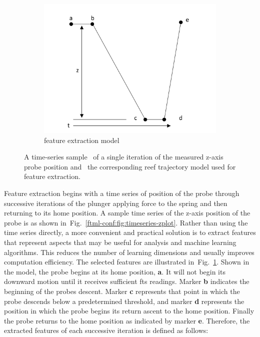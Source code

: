 \begin{figure}[!ht]
	\begin{subfigure}{.95\textwidth}
		\centering
		\includegraphics[]{./chapter-ftml/diagrams/timeseries.png}  
		\caption{feature extraction model}
		\label{ftml-conf:fig:timeseriesfeatures}
	\end{subfigure}
	
	\caption{A time-series sample~\protect{} of a single iteration of the measured z-axis probe position and~\protect{} the corresponding \gls{reef} trajectory model used for feature extraction.}
	\label{ftml-conf:fig:timeseries-and-model}
	
\end{figure}

Feature extraction begins with a time series of position of the probe through successive iterations of the plunger applying force to the spring and then returning to its home position.  A sample time series of the z-axis position of the probe is as shown in~Fig.~\ref{ftml-conf:fig:timeseries-zplot}.  Rather than using the time series directly, a more convenient and practical solution is to extract features that represent aspects that may be useful for analysis and machine learning algorithms.  This reduces the number of learning dimensions and usually improves computation efficiency.  The selected features are illustrated in~Fig.~\ref{ftml-conf:fig:timeseriesfeatures}.   Shown in the model, the probe begins at its home position, \textbf{a}.  It will not begin its downward motion until it receives sufficient \gls{fts} readings.  Marker \textbf{b} indicates the beginning of the probes descent.  Marker \textbf{c} represents that point in which the probe descends below a predetermined threshold, and marker \textbf{d} represents the position in which the probe begins its return ascent to the home position.  Finally the probe returns to the home position as indicated by marker \textbf{e}.  Therefore, the extracted features of each successive iteration is defined as follows:

